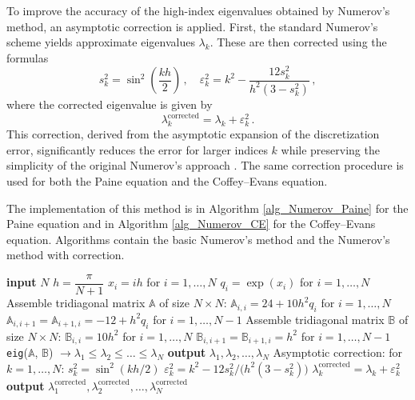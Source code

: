 \documentclass[11pt,a4paper,oneside,openright]{report} %
\begin{document}
To improve the accuracy of the high-index eigenvalues obtained by Numerov's method, an asymptotic correction is applied. First, the standard Numerov's scheme yields approximate eigenvalues $\lambda_k$. These are then corrected using the formulas
\begin{equation}
s_k^2 = \sin^2\left(\frac{k h}{2}\right) \, , \quad
\varepsilon_k^2 = k^2 - \frac{12 s_k^2}{h^2 (3 - s_k^2)} \, ,
\end{equation}
where the corrected eigenvalue is given by
\begin{equation}
\lambda_k^{\text{corrected}} = \lambda_k + \varepsilon_k^2 \, .
\end{equation}
This correction, derived from the asymptotic expansion of the discretization error, significantly reduces the error for larger indices $k$ while preserving the simplicity of the original Numerov's approach \cite{numerov}. The same correction procedure is used for both the Paine equation and the Coffey--Evans equation.

The implementation of this method is in Algorithm \ref{alg_Numerov_Paine} for the Paine equation and in Algorithm \ref{alg_Numerov_CE} for the Coffey--Evans equation. Algorithms contain the basic Numerov's method and the Numerov's method with correction.

\begin{algorithm}[H]
\caption{Numerov's method - Paine equation}
\label{alg_Numerov_Paine}
{\small
\begin{algorithmic}[1]
\State \textbf{input} $N$
\State $h = \dfrac{\pi}{N + 1}$
\State $x_i = i h$ \quad for $i = 1, \dots, N$
\State $q_i = \exp(x_i)$ \quad for $i = 1, \dots, N$
\BlankLine
\State Assemble tridiagonal matrix $\mathbb{A}$ of size $N \times N$:
\State \quad $\mathbb{A}_{i,i} = 24 + 10 h^2 q_i$ \quad for $i=1, \dots,N$
\State \quad $\mathbb{A}_{i,i+1} = \mathbb{A}_{i+1,i} = - 12 + h^2 q_i$ \quad for $i=1, \dots,N-1$
\BlankLine
\State Assemble tridiagonal matrix $\mathbb{B}$ of size $N \times N$:
\State \quad $\mathbb{B}_{i,i} = 10 h^2$ \quad for $i=1, \dots,N$
\State \quad $\mathbb{B}_{i,i+1} = \mathbb{B}_{i+1,i} = h^2$ \quad for $i=1, \dots,N-1$
\BlankLine
\State \texttt{eig}($\mathbb{A}$, $\mathbb{B}$) $ \to \lambda_1 \leq \lambda_2 \leq \dots \leq \lambda_N$
\State \textbf{output} $\lambda_1, \lambda_2, \dots, \lambda_N$
\BlankLine
\State Asymptotic correction:
\State \quad for $k = 1, \dots,N$:
\State \quad \quad $s_k^2 = \sin^2(k h / 2)$
\State \quad \quad $\varepsilon_k^2 = k^2 - 12  s_k^2  /  \big(h^2  (3 - s_k^2) \big)$
\State \quad \quad $\lambda_k^{\text{corrected}} = \lambda_k + \varepsilon_k^2$
\State \textbf{output} $\lambda_1^{\text{corrected}}, \lambda_2^{\text{corrected}},  \dots, \lambda_N^{\text{corrected}}$
\end{algorithmic}
}
\end{algorithm}
\end{document}
